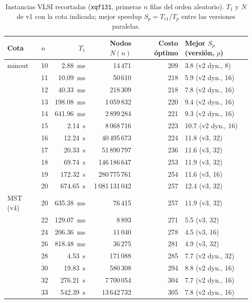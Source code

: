 \begin{table}[H]
\centering
\caption{Instancias VLSI recortadas (\texttt{xqf131}, primeras $n$ filas del orden aleatorio). $T_1$ y $N$ de v1 con la cota indicada; mejor speedup $S_p = T_{v1}/T_p$ entre las versiones paralelas.}
\label{tab:vlsi}
\small
\begin{tabular}{llrrrl}
\toprule
Cota & $n$ & $T_1$ & Nodos $N(n)$ & Costo óptimo & Mejor $S_p$ (versión, $p$) \\
\midrule
minout & 10 & 2.88~ms & 14\,471 & 209 & 3.8 (v2 dyn., 8) \\
 & 11 & 10.09~ms & 50\,610 & 218 & 5.9 (v2 dyn., 16) \\
 & 12 & 40.33~ms & 218\,309 & 218 & 7.8 (v2 dyn., 16) \\
 & 13 & 198.08~ms & 1\,059\,832 & 220 & 9.4 (v2 dyn., 16) \\
 & 14 & 641.96~ms & 2\,899\,284 & 221 & 9.3 (v2 dyn., 16) \\
 & 15 & 2.14~s & 8\,068\,716 & 223 & 10.7 (v2 dyn., 16) \\
 & 16 & 12.24~s & 40\,495\,673 & 224 & 11.8 (v3, 32) \\
 & 17 & 20.33~s & 51\,890\,797 & 236 & 11.6 (v3, 32) \\
 & 18 & 69.74~s & 146\,186\,647 & 253 & 11.9 (v3, 32) \\
 & 19 & 172.32~s & 280\,775\,761 & 254 & 11.6 (v3, 16) \\
 & 20 & 674.65~s & 1\,081\,131\,042 & 257 & 12.4 (v3, 32) \\
\midrule
MST (v4) & 20 & 635.38~ms & 76\,415 & 257 & 11.9 (v3, 32) \\
 & 22 & 129.07~ms & 8\,893 & 271 & 5.5 (v3, 32) \\
 & 24 & 206.36~ms & 11\,040 & 278 & 4.5 (v3, 16) \\
 & 26 & 818.48~ms & 36\,275 & 281 & 4.9 (v3, 32) \\
 & 28 & 4.53~s & 171\,088 & 285 & 7.7 (v2 dyn., 32) \\
 & 30 & 19.83~s & 580\,308 & 294 & 8.8 (v2 dyn., 16) \\
 & 32 & 276.21~s & 7\,700\,054 & 304 & 7.7 (v2 dyn., 16) \\
 & 33 & 542.39~s & 13\,642\,732 & 305 & 7.8 (v2 dyn., 16) \\
\bottomrule
\end{tabular}
\end{table}
